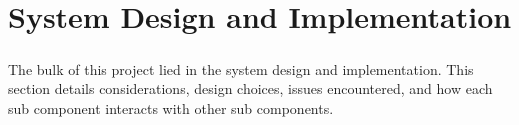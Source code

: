 \chapter{System Design and Implementation}

\paragraph{}
The bulk of this project lied in the system design and implementation.
This section details considerations, design choices, issues encountered, and how each sub component interacts with other sub components.